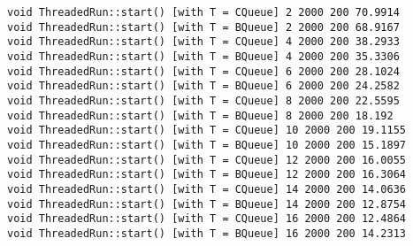 \begin{verbatim}
void ThreadedRun::start() [with T = CQueue] 2 2000 200 70.9914
void ThreadedRun::start() [with T = BQueue] 2 2000 200 68.9167
void ThreadedRun::start() [with T = CQueue] 4 2000 200 38.2933
void ThreadedRun::start() [with T = BQueue] 4 2000 200 35.3306
void ThreadedRun::start() [with T = CQueue] 6 2000 200 28.1024
void ThreadedRun::start() [with T = BQueue] 6 2000 200 24.2582
void ThreadedRun::start() [with T = CQueue] 8 2000 200 22.5595
void ThreadedRun::start() [with T = BQueue] 8 2000 200 18.192
void ThreadedRun::start() [with T = CQueue] 10 2000 200 19.1155
void ThreadedRun::start() [with T = BQueue] 10 2000 200 15.1897
void ThreadedRun::start() [with T = CQueue] 12 2000 200 16.0055
void ThreadedRun::start() [with T = BQueue] 12 2000 200 16.3064
void ThreadedRun::start() [with T = CQueue] 14 2000 200 14.0636
void ThreadedRun::start() [with T = BQueue] 14 2000 200 12.8754
void ThreadedRun::start() [with T = CQueue] 16 2000 200 12.4864
void ThreadedRun::start() [with T = BQueue] 16 2000 200 14.2313
\end{verbatim}

